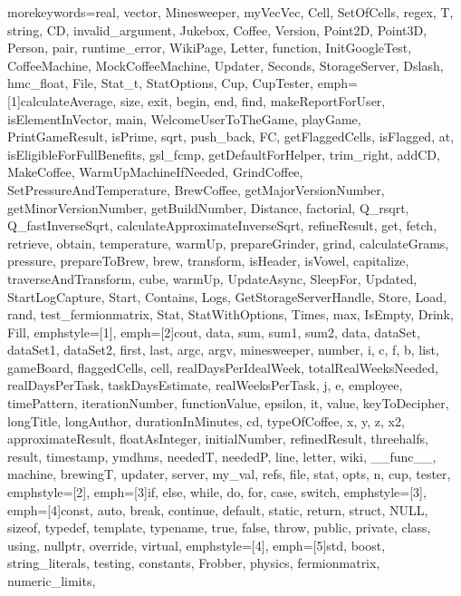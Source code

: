 {morekeywords={real, vector, Minesweeper, myVecVec, Cell, SetOfCells, regex, T, string, CD,
              invalid_argument, Jukebox, Coffee, Version, Point2D, Point3D, Person, pair,
              runtime_error, WikiPage, Letter, function, InitGoogleTest, CoffeeMachine,
              MockCoffeeMachine, Updater, Seconds, StorageServer, Dslash, hmc_float, File,
              Stat_t, StatOptions, Cup, CupTester},
emph=[1]{calculateAverage, size, exit, begin, end, find, makeReportForUser, isElementInVector,
         main, WelcomeUserToTheGame, playGame, PrintGameResult, isPrime, sqrt, push_back, FC,
         getFlaggedCells, isFlagged, at, isEligibleForFullBenefits, gsl_fcmp, getDefaultForHelper,
         trim_right, addCD, MakeCoffee, WarmUpMachineIfNeeded, GrindCoffee, SetPressureAndTemperature,
         BrewCoffee, getMajorVersionNumber, getMinorVersionNumber, getBuildNumber, Distance, factorial,
         Q_rsqrt, Q_fastInverseSqrt, calculateApproximateInverseSqrt, refineResult, get, fetch, retrieve,
         obtain, temperature, warmUp, prepareGrinder, grind, calculateGrams, pressure, prepareToBrew, brew,
         transform, isHeader, isVowel, capitalize, traverseAndTransform, cube, warmUp, UpdateAsync, SleepFor,
         Updated, StartLogCapture, Start, Contains, Logs, GetStorageServerHandle, Store, Load, rand,
         test_fermionmatrix, Stat, StatWithOptions, Times, max, IsEmpty, Drink, Fill},
emphstyle=[1]{\color{NavyBlue}}, %
emph=[2]{cout, data, sum, sum1, sum2, data, dataSet, dataSet1, dataSet2, first, last, argc, argv, minesweeper,
         number, i, c, f, b, list, gameBoard, flaggedCells, cell, realDaysPerIdealWeek, totalRealWeeksNeeded,
         realDaysPerTask, taskDaysEstimate, realWeeksPerTask, j, e, employee, timePattern, iterationNumber,
         functionValue, epsilon, it, value, keyToDecipher, longTitle, longAuthor, durationInMinutes, cd,
         typeOfCoffee, x, y, z, x2, approximateResult, floatAsInteger, initialNumber, refinedResult,
         threehalfs, result, timestamp, ymdhms, neededT, neededP, line, letter, wiki, __func__, machine,
         brewingT, updater, server, my_val, refs, file, stat, opts, n, cup, tester},
emphstyle=[2]{\color{Orange}}, %
emph=[3]{if, else, while, do, for, case, switch},
emphstyle=[3]{\color{violet}}, %
emph=[4]{const, auto, break, continue, default, static, return, struct, NULL, sizeof, typedef,
         template, typename, true, false, throw, public, private, class, using, nullptr, override, virtual},
emphstyle=[4]{\color{ProcessBlue}}, %
emph=[5]{std, boost, string_literals, testing, constants, Frobber, physics, fermionmatrix, numeric_limits},
}
